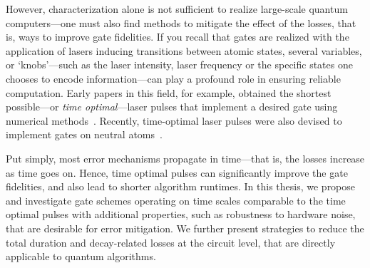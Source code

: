\documentclass[main.tex]{subfiles}
\begin{document}
However, characterization alone is not sufficient to realize large-scale quantum computers---one must also find methods to mitigate the effect of the losses, that is, ways to improve gate fidelities. If you recall that gates are realized with the application of lasers inducing transitions between atomic states, several variables, or `knobs'---such as the laser intensity, laser frequency or the specific states one chooses to encode information---can play a profound role in ensuring reliable computation. Early papers in this field, for example, obtained the shortest possible---or \emph{time optimal}---laser pulses that implement a desired gate using numerical methods~\cite{PhysRevA.63.032308, PhysRevA.65.032301,d2002optimal,RevModPhys.76.1037}. Recently, time-optimal laser pulses were also devised to implement gates on neutral atoms~\cite{jandura_time-optimal_2022}. 

Put simply, most error mechanisms propagate in time---that is, the losses increase as time goes on. Hence, time optimal pulses can significantly improve the gate fidelities, and also lead to shorter algorithm runtimes. In this thesis, we propose and investigate gate schemes operating on time scales comparable to the time optimal pulses with additional properties, such as robustness to hardware noise, that are desirable for error mitigation. We further present strategies to reduce the total duration and decay-related losses at the circuit level, that are directly applicable to quantum algorithms. %
\end{document}
